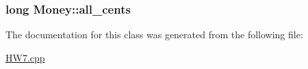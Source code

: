 \subsubsection[{\texorpdfstring{all\+\_\+cents}{all_cents}}]{\setlength{\rightskip}{0pt plus 5cm}long Money\+::all\+\_\+cents\hspace{0.3cm}{\ttfamily [private]}}\hypertarget{classMoney_a499d11509460668b7c262d9a58f7f310}{}\label{classMoney_a499d11509460668b7c262d9a58f7f310}


The documentation for this class was generated from the following file\+:\begin{DoxyCompactItemize}
\item 
\hyperlink{HW7_8cpp}{H\+W7.\+cpp}\end{DoxyCompactItemize}
